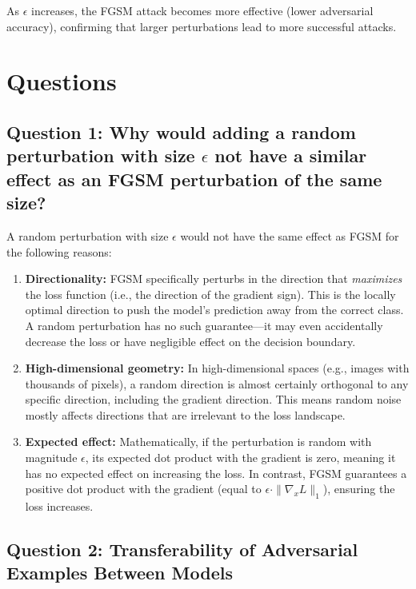 \documentclass[11pt]{article}
\begin{document}
As $\epsilon$ increases, the FGSM attack becomes more effective (lower adversarial accuracy), confirming that larger perturbations lead to more successful attacks.

\section{Questions}

\subsection{Question 1: Why would adding a random perturbation with size $\epsilon$ not have a similar effect as an FGSM perturbation of the same size?}

A random perturbation with size $\epsilon$ would not have the same effect as FGSM for the following reasons:

\begin{enumerate}
    \item \textbf{Directionality:} FGSM specifically perturbs in the direction that \emph{maximizes} the loss function (i.e., the direction of the gradient sign). This is the locally optimal direction to push the model's prediction away from the correct class. A random perturbation has no such guarantee---it may even accidentally decrease the loss or have negligible effect on the decision boundary.
    
    \item \textbf{High-dimensional geometry:} In high-dimensional spaces (e.g., images with thousands of pixels), a random direction is almost certainly orthogonal to any specific direction, including the gradient direction. This means random noise mostly affects directions that are irrelevant to the loss landscape.
    
    \item \textbf{Expected effect:} Mathematically, if the perturbation is random with magnitude $\epsilon$, its expected dot product with the gradient is zero, meaning it has no expected effect on increasing the loss. In contrast, FGSM guarantees a positive dot product with the gradient (equal to $\epsilon \cdot \|\nabla_x L\|_1$), ensuring the loss increases.
\end{enumerate}

\subsection{Question 2: Transferability of Adversarial Examples Between Models}
\end{document}
